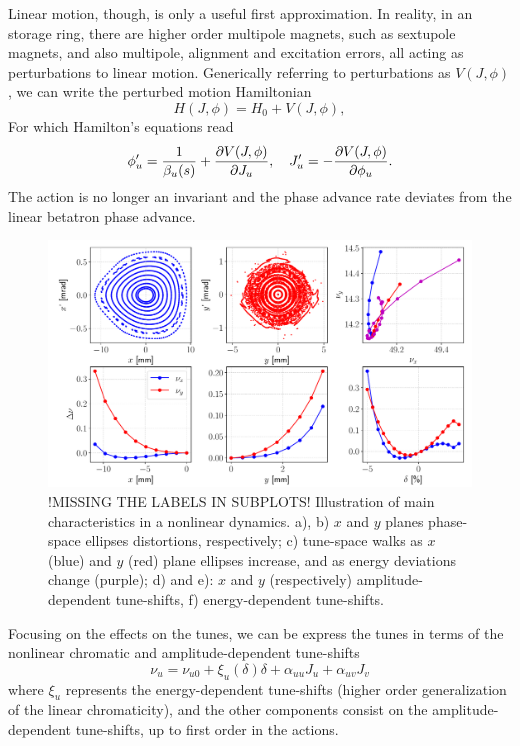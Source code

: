 Linear motion, though, is only a useful first approximation. In reality, in an storage ring, there are higher order multipole magnets, such as sextupole magnets, and also multipole, alignment and excitation errors, all acting as perturbations to linear motion. Generically referring to perturbations as $V(J, \phi)$, we can write the perturbed motion Hamiltonian
\begin{equation}
    H(J,\phi) =H_0 + V(J,\phi),
\end{equation}
For which Hamilton's equations read
\begin{equation}
\phi_u^\prime = \frac{1}{\beta_u(s)}+\pdv{V(J,\phi)}{J_u}, \quad J_u^\prime = -\pdv{V(J,\phi)}{\phi_u}.
\end{equation}
The action is no longer an invariant and the phase advance rate deviates from the linear betatron phase advance.
\begin{figure}
    \centering
    \includegraphics[width=\textwidth]{Images/nonlinear_dynamics_phase_tunes.pdf}
    \caption[Illustration of main characteristics in a nonlinear dynamics]{!MISSING THE LABELS IN SUBPLOTS! Illustration of main characteristics in a nonlinear dynamics. a), b) $x$ and $y$ planes phase-space ellipses distortions, respectively; c) tune-space walks as $x$ (blue) and $y$ (red) plane ellipses increase, and as energy deviations change (purple); d) and e): $x$ and $y$ (respectively) amplitude-dependent tune-shifts, f) energy-dependent tune-shifts.}
    \label{fig:tune_shifts}
\end{figure}

Focusing on the effects on the tunes, we can be express the tunes in terms of the nonlinear chromatic and amplitude-dependent tune-shifts
\begin{equation}
    \nu_u = \nu_{u0} + \xi_u(\delta) \delta + \alpha_{uu} J_u + \alpha_{uv} J_v
\end{equation}
where $\xi_u$ represents the energy-dependent tune-shifts (higher order generalization of the linear chromaticity), and the other components consist on the amplitude-dependent tune-shifts, up to first order in the actions.

